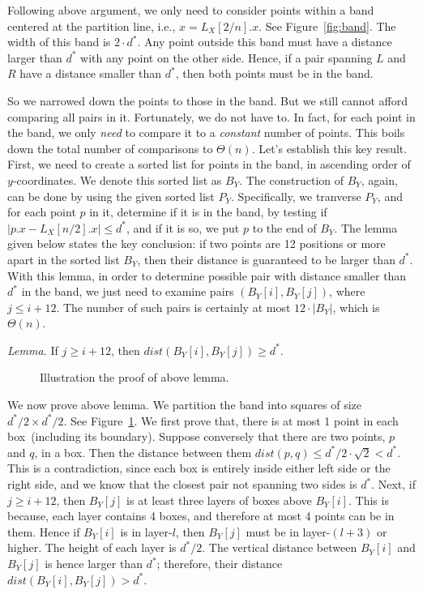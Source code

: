 Following above argument, we only need to consider points within a band
centered at the partition line, i.e., $x = L_X[2/n].x$.  See
Figure~\ref{fig:band}.  The width of this band is $2\cdot d^*$.
Any point outside this band must have a distance larger
than $d^*$ with any point on the other side.
Hence, if a pair spanning $L$ and $R$ have a distance smaller than $d^*$,
then both points must be in the band.

So we narrowed down the points to those in the band.
But we still cannot afford comparing all pairs in it.
Fortunately, we do not have to. In fact, for each point in the band,
we only \emph{need} to compare it to a \emph{constant} number of points.
This boils down the total number of comparisons to $\Theta(n)$.
Let's establish this key result. First, we need to create a sorted list
for points in the band, in ascending order of $y$-coordinates.
We denote this sorted list as $B_Y$.
The construction of $B_Y$, again, can be done by using the given sorted
list $P_Y$.  Specifically, we tranverse $P_Y$, and for each point $p$ in it,
determine if it is in the band, by testing if $|p.x - L_X[n/2].x| \le d^*$,
and if it is so, we put $p$ to the end of $B_Y$. The lemma given below states
the key conclusion: if two points are 12 positions or more apart in the
sorted list $B_Y$, then their distance is guaranteed to be larger than $d^*$.
With this lemma, in order to determine possible pair with distance smaller than $d^*$ in the band,
we just need to examine pairs $(B_Y[i], B_Y[j])$, where $j \le i + 12$.
The number of such pairs is certainly at most $12\cdot |B_Y|$, which is $\Theta(n)$.

\emph{Lemma.} If $j \ge i + 12$, then $dist(B_Y[i], B_Y[j]) \ge d^*$.

\begin{figure}[b!]
\centering{}
\caption{Illustration the proof of above lemma.}
\label{fig:boxes}
\end{figure}

We now prove above lemma. We partition the band into squares of size $d^*/2 \times d^*/2$.
See Figure~\ref{fig:boxes}. We first prove that, there is at most 1 point in each box~(including its boundary).
Suppose conversely that there are two points, $p$ and $q$, in a box.
Then the distance between them $dist(p,q) \le d^*/2\cdot \sqrt{2} < d^*$.
This is a contradiction, since each box is entirely inside either left side or the right side,
and we know that the closest pair not spanning two sides is $d^*$.
Next, if $j \ge i + 12$, then $B_Y[j]$ is at least three layers of boxes above $B_Y[i]$.
This is because, each layer contains 4 boxes, and therefore at most 4 points can be in them.
Hence if $B_Y[i]$ is in layer-$l$, then $B_Y[j]$ must be in layer-$(l + 3)$ or higher.
The height of each layer is $d^*/2$. The vertical distance between $B_Y[i]$ and $B_Y[j]$
is hence larger than $d^*$; therefore, their distance $dist(B_Y[i], B_Y[j]) > d^*$.

